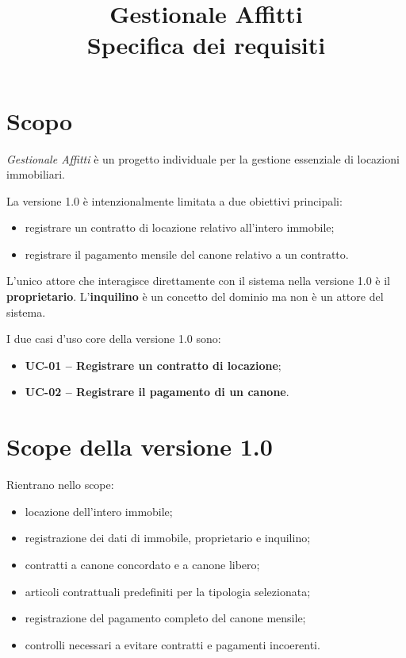 \documentclass[12pt,a4paper]{article}
\title{Gestionale Affitti\\Specifica dei requisiti}
\author{}
\date{}
\begin{document}
\maketitle
\tableofcontents
\newpage

\section{Scopo}

\emph{Gestionale Affitti} è un progetto individuale per la gestione essenziale di
locazioni immobiliari.

La versione 1.0 è intenzionalmente limitata a due obiettivi principali:
\begin{itemize}
    \item registrare un contratto di locazione relativo all'intero immobile;
    \item registrare il pagamento mensile del canone relativo a un contratto.
\end{itemize}

L'unico attore che interagisce direttamente con il sistema nella versione 1.0 è il
\textbf{proprietario}. L'\textbf{inquilino} è un concetto del dominio ma non è un attore
del sistema.

I due casi d'uso core della versione 1.0 sono:

\begin{itemize}
    \item \textbf{UC-01 -- Registrare un contratto di locazione};
    \item \textbf{UC-02 -- Registrare il pagamento di un canone}.
\end{itemize}

\section{Scope della versione 1.0}

Rientrano nello scope:
\begin{itemize}
    \item locazione dell'intero immobile;
    \item registrazione dei dati di immobile, proprietario e inquilino;
    \item contratti a canone concordato e a canone libero;
    \item articoli contrattuali predefiniti per la tipologia selezionata;
    \item registrazione del pagamento completo del canone mensile;
    \item controlli necessari a evitare contratti e pagamenti incoerenti.
\end{itemize}
\end{document}
